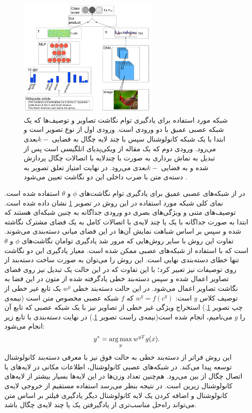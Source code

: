 \begin{figure}[th] 
\begin{center}
\includegraphics[width=7cm]{images/ba.jpg}
\end{center}
\caption[نمای کلی روش \cite{ba2015}]{
 شبکه مورد استفاده برای یادگیری توام نگاشت تصاویر و توصیف‌ها که یک شبکه عصبی عمیق با دو ورودی است. ورودی اول از نوع تصویر است و ابتدا با یک شبکه کانولوشنال سپس با چند لایه چگال به فضایی $k-$بعدی می‌رود. ورودی دوم که یک مقاله از ویکی‌پدیای انلگیسی است پس از تبدیل به نماش برداری به صورت  با چندلایه با اتصالات چگال پردازش شده و به فضایی $k-$بعدی می‌رود. در نهایت امتیاز تعلق تصویر به دسته‌ی متن با ضرب داخلی این دو نگاشت تعیین می‌شود \cite{ba2015}.
}
\label{fig:deep}
\end{figure}

در  \cite{ba2015} از شبکه‌های عصبی عمیق برای یادگیری توام نگاشت‌های $\phi$ و $\theta$ استفاده شده است. نمای کلی شبکه مورد استفاده در این روش در تصویر
\ref{fig:deep}
نشان داده شده است. توصیف‌های متنی و ويژگی‌های بصری دو ورودی جداگانه به چنین شبکه‌ای هستند که ابتدا به صورت جداگانه با یک یا چند لایه‌ی با اتصالات کامل به یک فضای مشترک نگاشته شده و سپس بر اساس شباهت نمایش آن‌ها در این فضای میانی دسته‌بندی می‌شوند. تفاوت این روش با سایر روش‌هایی که مرور شد یادگیری توامان نگاشت‌های  $\phi$ و $\theta$ است که با استفاده از شبکه‌های عصبی ممکن شده است. معیار یادگیری این دو نگاشت تنها خطای دسته‌بندی نهایی است.
این روش را می‌توان به صورت ساخت دسته‌بند از روی توصیفات نیز تعبیر کرد؛ با این تفاوت که در این حالت یک تبدیل نیز روی فضای تصاویر اعمال شده و سپس دسته‌بند خطی یادگرفته شده از متون در این فضا به نگاشت تصاویر اعمال می‌شود. در این حالت دسته‌بند خطی $w^y$ یک تابع غیر خطی از توصیف کلاس $y$ است: $w^y = f(c^y)$ که $f$ شبکه عصبی مخصوص متن است (نیمه‌ی چپ تصویر \ref{fig:deep}.) استخراج ویژگی غیر خطی از تصاویر نیز با یک شبکه عصبی که تابع آن را $g$ می‌نامیم، انجام شده است(نیمه‌ی راست تصویر \ref{fig:deep}.) در نهایت دسته‌بندی با تابع زیر انجام می‌شود:
\begin{equation} \label{eq:ba_classifier}
y^* = \operatorname*{arg\,max}_y{w^{yT} g(x)}.
\end{equation}
این روش فراتر از دسته‌بند خطی به حالت فوق نیز با معرفی دسته‌بند کانولوشنال توسعه پیدا می‌کند. در شبکه‌های عصبی کانولوشنال، اطلاعات مکانی در  لایه‌های با اتصال چگال از بین می‌رود. هم‌چنین تعداد وزن‌ها در این لایه‌ها بسیار بیشتر از لایه‌های کانولوشنال زیرین است. در نتیجه بنظر می‌رسد استفاده مستقیم از خروجی لایه‌ی کانولوشنال و اضافه کردن یک لایه کانولوشنال دیگر یادگیری فیلتر بر اساس متن می‌تواند راه‌حل مناسب‌تری از یادگیرفتن یک یا چند لایه‌ی چگال باشد.

